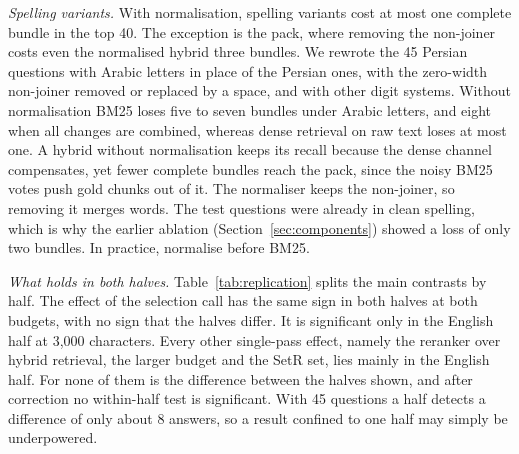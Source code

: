 \emph{Spelling variants.} With normalisation, spelling variants cost at most one complete bundle in the top 40. The exception is the pack, where removing the non-joiner costs even the normalised hybrid three bundles. We rewrote the 45 Persian questions with Arabic letters in place of the Persian ones, with the zero-width non-joiner removed or replaced by a space, and with other digit systems. Without normalisation BM25 loses five to seven bundles under Arabic letters, and eight when all changes are combined, whereas dense retrieval on raw text loses at most one. A hybrid without normalisation keeps its recall because the dense channel compensates, yet fewer complete bundles reach the pack, since the noisy BM25 votes push gold chunks out of it. The normaliser keeps the non-joiner, so removing it merges words. The test questions were already in clean spelling, which is why the earlier ablation (Section~\ref{sec:components}) showed a loss of only two bundles. In practice, normalise before BM25.

\emph{What holds in both halves.} Table~\ref{tab:replication} splits the main contrasts by half. The effect of the selection call has the same sign in both halves at both budgets, with no sign that the halves differ. It is significant only in the English half at 3,000 characters. Every other single-pass effect, namely the reranker over hybrid retrieval, the larger budget and the SetR set, lies mainly in the English half. For none of them is the difference between the halves shown, and after correction no within-half test is significant. With 45 questions a half detects a difference of only about 8 answers, so a result confined to one half may simply be underpowered.
